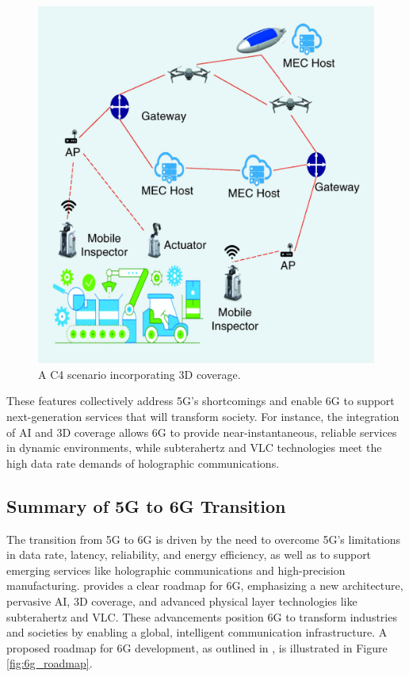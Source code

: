 \documentclass[acmtog]{acmart}
\begin{document}
\begin{figure}[h]
  \centering
  \includegraphics[width=\linewidth]{3D_coverage.png}
  \caption{A C4 scenario incorporating 3D coverage. \cite{ref4}}
\end{figure}

These features collectively address 5G's shortcomings and enable 6G to support next-generation services that will transform society. For instance, the integration of AI and 3D coverage allows 6G to provide near-instantaneous, reliable services in dynamic environments, while subterahertz and VLC technologies meet the high data rate demands of holographic communications.

\subsection{Summary of 5G to 6G Transition}

The transition from 5G to 6G is driven by the need to overcome 5G's limitations in data rate, latency, reliability, and energy efficiency, as well as to support emerging services like holographic communications and high-precision manufacturing. \citet{ref4} provides a clear roadmap for 6G, emphasizing a new architecture, pervasive AI, 3D coverage, and advanced physical layer technologies like subterahertz and VLC. These advancements position 6G to transform industries and societies by enabling a global, intelligent communication infrastructure. A proposed roadmap for 6G development, as outlined in \citet{ref4}, is illustrated in Figure \ref{fig:6g_roadmap}.
\end{document}
